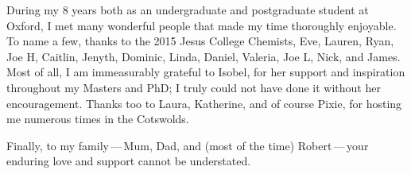 \begin{acknowledgements}
    During my 8 years both as an undergraduate and postgraduate student at
    Oxford, I met many wonderful people that made my time thoroughly enjoyable.
    To name a few, thanks to the 2015 Jesus College Chemists, Eve, Lauren,
    Ryan, Joe H, Caitlin, Jenyth, Dominic, Linda, Daniel, Valeria, Joe L, Nick,
    and James.  Most of all, I am immeasurably grateful to Isobel, for her
    support and inspiration throughout my Masters and PhD; I truly could not
    have done it without her encouragement. Thanks too to Laura,
    Katherine, and of course Pixie, for hosting me numerous times in the
    Cotswolds.

    Finally, to my family\,---\,Mum, Dad, and (most of the time)
    Robert\,---\,your enduring love and support cannot be understated.
\end{acknowledgements}
